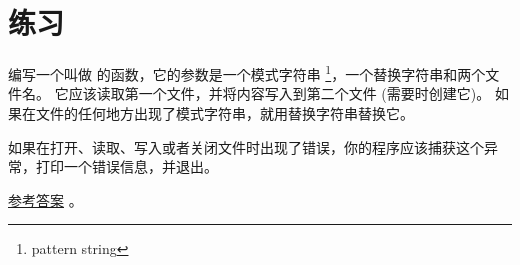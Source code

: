 {{{{{{{\begin{description}
{{%

\item[管道对象 (pipe object)：] 一个代表某个正在运行的程序的对象，允许一个 Python 程序去运行命令并得到运行结果。

  

\end{description}


\section{练习}

\begin{exercise}


编写一个叫做 {\em {}} 的函数，它的参数是一个模式字符串 \footnote{pattern string}，一个替换字符串和两个文件名。
它应该读取第一个文件，并将内容写入到第二个文件 (需要时创建它)。
如果在文件的任何地方出现了模式字符串，就用替换字符串替换它。


如果在打开、读取、写入或者关闭文件时出现了错误，你的程序应该捕获这个异常，打印一个错误信息，并退出。

\href{http://thinkpython2.com/code/sed.py}{参考答案} 。

\end{exercise}

\begin{exercise}



\end{exercise}}}}}}}}
